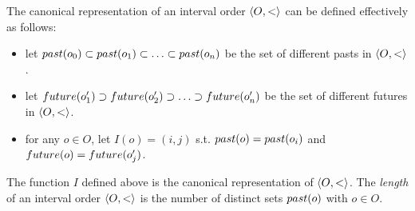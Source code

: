 The canonical representation of an interval order $\left\langle {O,<} \right\rangle$ can be defined effectively 
as follows:
\begin{itemize}

	\item let $past({o_0})\subset past({o_1})\subset \ldots\subset
past({o_n})$ be the set of different pasts in $\left\langle {O,<} \right\rangle$. 

	\item let $future({o_1'})\supset future({o_2'})\supset \ldots\supset
future({o_n'})$ be the set of different futures in $\left\langle {O,<} \right\rangle$.

	\item for any $o\in O$, let $I(o)=(i,j)$ s.t. $past({o})=past({o_i})$ and
$future({o})=future({o_j'})$.

\end{itemize}

\begin{lemma}

  The function $I$ defined above is the canonical representation of $\left\langle {O,<} \right\rangle$.
  The \emph{length} of an interval order $\left\langle {O,<} \right\rangle$ is the number of distinct sets $past({o})$ with $o\in O$.

\end{lemma}








